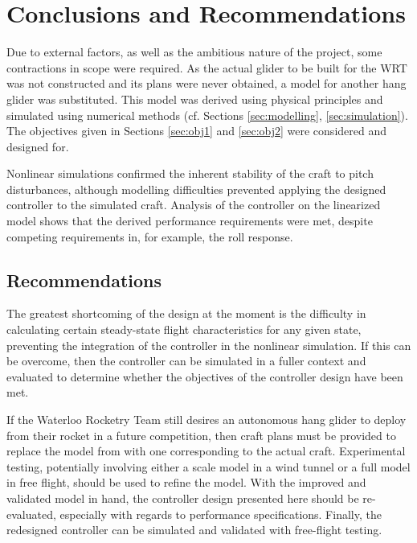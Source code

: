 \documentclass{sydeStyle}
\begin{document}
\chapter{Conclusions and Recommendations}
Due to external factors, as well as the ambitious nature of the project, some
contractions in scope were required.  As the actual glider to be built for the
WRT was not constructed and its plans were never obtained, a model for another
hang glider was substituted.  This model was derived using physical principles
and simulated using numerical methods (cf. Sections \ref{sec:modelling},
\ref{sec:simulation}).  The objectives given in Sections \ref{sec:obj1} and
\ref{sec:obj2} were considered and designed for.

Nonlinear simulations confirmed the inherent stability of the craft to pitch
disturbances, although modelling difficulties prevented applying the designed
controller to the simulated craft.  Analysis of the controller on the linearized
model shows that the derived performance requirements were met, despite
competing requirements in, for example, the roll response.

\section{Recommendations}
The greatest shortcoming of the design at the moment is the difficulty in
calculating certain steady-state flight characteristics for any given state,
preventing the integration of the controller in the nonlinear simulation.  If
this can be overcome, then the controller can be simulated in a fuller
context and evaluated to determine whether the objectives of the controller
design have been met.

If the Waterloo Rocketry Team still desires an autonomous hang glider to deploy
from their rocket in a future competition, then craft plans must be provided to
replace the model from \cite{spottiswoode} with one corresponding to the actual
craft.  Experimental testing, potentially involving either a scale model in a
wind tunnel or a full model in free flight, should be used to refine the model.
With the improved and validated model in hand, the controller design presented
here should be re-evaluated, especially with regards to performance
specifications.  Finally, the redesigned controller can be simulated and
validated with free-flight testing.
\end{document}
